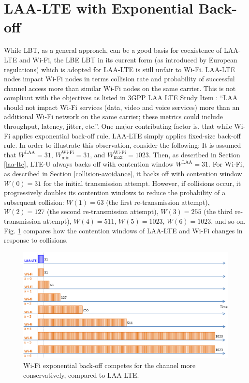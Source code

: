 \section{LAA-LTE with Exponential Back-off}
\label{subsection:exp-back-off}

While LBT, as a general approach, can be a good basis for coexistence of \mbox{LAA-LTE} and \mbox{Wi-Fi}, the LBE LBT in its current form (as introduced by European regulations) which is adopted for \mbox{LAA-LTE} is still unfair to \mbox{Wi-Fi}. \mbox{LAA-LTE} nodes impact \mbox{Wi-Fi} nodes in terms collision rate and probability of successful channel access more than similar \mbox{Wi-Fi} nodes on the same carrier. This is not compliant with the objectives as listed in 3GPP LAA LTE Study Item \cite{LAA-LTE-SI}: ``LAA should not impact \mbox{Wi-Fi} services (data, video and voice services) more than an additional \mbox{Wi-Fi} network on the same carrier; these metrics could include throughput, latency, jitter, etc.''. One major contributing factor is, that while \mbox{Wi-Fi} applies exponential back-off rule, \mbox{LAA-LTE} simply applies fixed-size back-off rule. In order to illustrate this observation, consider the following: It is assumed that $W^{{\mbox{LAA}}}=31$, $W^{\mbox{Wi-Fi}}_{\min}=31$, and $W^{{\mbox{Wi-Fi}}}_{\max}=1023$. Then, as described in Section \ref{laa-lte}, \mbox{LTE-U} always backs off with contention window $W^{\mathrm{\mbox{LAA}}}=31$. For \mbox{Wi-Fi}, as described in Section \ref{collision-avoidance}, it backs off with contention window $W(0)=31$ for the initial transmission attempt. However, if collisions occur, it progressively doubles its contention windows to reduce the probability of a subsequent collision: $W(1)=63$ (the first re-transmission attempt), $W(2)=127$ (the second re-transmission attempt), $W(3)=255$ (the third re-transmission attempt), $W(4)=511$, $W(5)=1023$, $W(6)=1023$, and so on. Fig. \ref{figs:LAA-LTE-enhacement-back-off} compares how the contention windows of \mbox{LAA-LTE} and \mbox{Wi-Fi} changes in response to collisions.
\begin{figure}[!ht]
	\centering
	\includegraphics[width=1.0\columnwidth]{figs/LAA-LTE-enhacement-back-off}
	\caption{\mbox{Wi-Fi} exponential back-off competes for the channel more conservatively, compared to \mbox{LAA-LTE}.}
	\label{figs:LAA-LTE-enhacement-back-off}
\end{figure}

